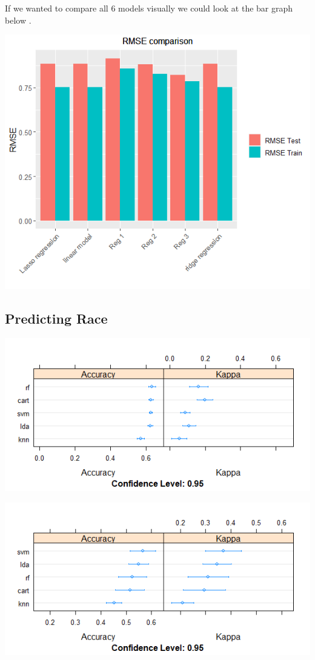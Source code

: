 \documentclass[11pt,preprint, authoryear]{elsarticle}
\let\origfigure\figure
\let\endorigfigure\endfigure
\renewenvironment{figure}[1][2] {
    \expandafter\origfigure\expandafter[H]
} {
    \endorigfigure
}
\numberwithin{equation}{section}
\numberwithin{figure}{section}
\numberwithin{table}{section}
\begin{document}
If we wanted to compare all 6 models visually we could look at the bar
graph below .

\includegraphics{"images/RMSE.png"} \label{RMSEimg}

\hypertarget{predicting-race}{%
\subsection{\texorpdfstring{Predicting Race
\label{race}}{Predicting Race }}\label{predicting-race}}

\begin{figure}
\centering
\includegraphics{"images/unbal.png"}
\caption{Machine Learning applied to unbalanced data}
\end{figure}

\begin{figure}
\centering
\includegraphics{"images/bal1.png"}
\caption{Machine Learning applied to balanced (undersampled) data}
\end{figure}
\end{document}
